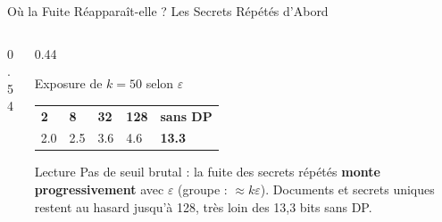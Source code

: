 \begin{frame}{Où la Fuite Réapparaît-elle ? Les Secrets Répétés d'Abord}
    \begin{columns}[T]
        \begin{column}{0.54\textwidth}
        \end{column}
        \begin{column}{0.44\textwidth}
            \begin{block}{Exposure de $k=50$ selon $\varepsilon$}
                \renewcommand{\arraystretch}{1.0}
                {\scriptsize
                \begin{tabularx}{\textwidth}{X X X X X}
                    \rowcolor{TSPblue}\color{white}\textbf{2} & \color{white}\textbf{8} & \color{white}\textbf{32} & \color{white}\textbf{128} & \color{white}\textbf{sans DP} \\
                    2.0 & 2.5 & 3.6 & 4.6 & \textbf{13.3} \\
                \end{tabularx}
                }
            \end{block}
            \begin{alertblock}{Lecture}
                \scriptsize Pas de seuil brutal : la fuite des secrets répétés \textbf{monte progressivement} avec $\varepsilon$ (groupe : $\approx k\varepsilon$). Documents et secrets uniques restent au hasard jusqu'à 128, très loin des 13,3 bits sans DP.
            \end{alertblock}
        \end{column}
    \end{columns}
\end{frame}

